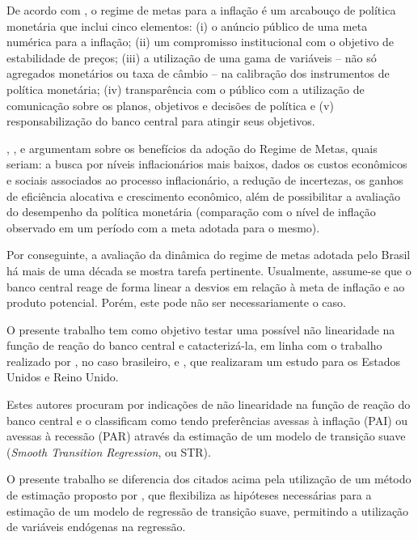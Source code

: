 \documentclass[
	article,			%
	11pt,				%
	oneside,			%
	a4paper,			%
	english,			%
	brazil,				%
	]{abntex2}
\begin{document}
	De acordo com , o regime de metas para a inflação é um arcabouço de política monetária que inclui cinco elementos: (i) o anúncio público de uma meta numérica para a inflação; (ii) um compromisso institucional com o objetivo de estabilidade de preços; (iii) a utilização de uma gama de variáveis – não só agregados monetários ou taxa de câmbio – na calibração dos instrumentos de política monetária; (iv) transparência com o público com a utilização de comunicação sobre os planos, objetivos e decisões de política e (v) responsabilização do banco central para atingir seus objetivos.
	
	, ,  e  argumentam sobre os benefícios da adoção do Regime de Metas, quais seriam: a busca por níveis inflacionários mais baixos, dados os custos econômicos e sociais associados ao processo inflacionário, a redução de incertezas, os ganhos de eficiência alocativa e crescimento econômico, além de possibilitar a avaliação do desempenho da política monetária (comparação com o nível de inflação observado em um período com a meta adotada para o mesmo).
	
	Por conseguinte, a avaliação da dinâmica do regime de metas adotada pelo Brasil há mais de uma década se mostra tarefa pertinente. Usualmente, assume-se que o banco central reage de forma linear a desvios em relação à meta de inflação e ao produto potencial.  Porém, este pode não ser necessariamente o caso.
	
	O presente trabalho tem como objetivo testar uma possível não linearidade na função de reação do banco central e catacterizá-la, em linha com o trabalho realizado por , no caso brasileiro, e , que realizaram um estudo para os Estados Unidos e Reino Unido. 
	
	Estes autores procuram por indicações de não linearidade na função de reação do banco central e o classificam como tendo preferências avessas à inflação (PAI) ou avessas à recessão (PAR) através da estimação de um modelo de transição suave (\textit{Smooth Transition Regression}, ou STR).
	
	O presente trabalho se diferencia dos citados acima pela utilização de um método de estimação proposto por , que flexibiliza as hipóteses necessárias para a estimação de um modelo de regressão de transição suave, permitindo a utilização de variáveis endógenas na regressão. 
	
\end{document}
